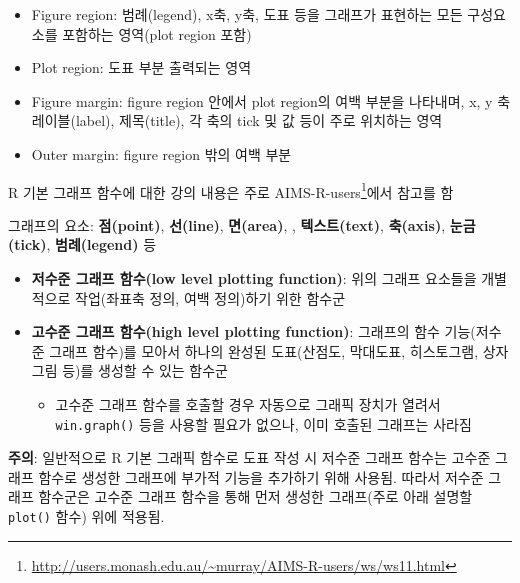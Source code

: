 \documentclass[
  11pt,
]{krantz}
\makeatletter
\providecommand{\tightlist}{%
  \setlength{\itemsep}{0pt}\setlength{\parskip}{0pt}}
\renewcommand{\href}[2]{#2\footnote{\url{#1}}}
\newenvironment{kframe}{%
\medskip{}
\setlength{\fboxsep}{.8em}
 \def\at@end@of@kframe{}%
 \ifinner\ifhmode%
  \def\at@end@of@kframe{\end{minipage}}%
  \begin{minipage}{\columnwidth}%
 \fi\fi%
 \def\FrameCommand##1{\hskip\@totalleftmargin \hskip-\fboxsep
 \colorbox{shadecolor}{##1}\hskip-\fboxsep
     \hskip-\linewidth \hskip-\@totalleftmargin \hskip\columnwidth}%
 \MakeFramed {\advance\hsize-\width
   \@totalleftmargin\z@ \linewidth\hsize
   \@setminipage}}%
 {\par\unskip\endMakeFramed%
 \at@end@of@kframe}
\newenvironment{rmdblock}[1]
  {
  \begin{itemize}
  \renewcommand{\labelitemi}{
    \raisebox{-.7\height}[0pt][0pt]{
      {\setkeys{Gin}{width=3em,keepaspectratio}\texttt{[image: images/\#1]}}
    }
  }
  \setlength{\fboxsep}{1em}
  \begin{kframe}
  \item
  }
  {
  \end{kframe}
  \end{itemize}
  }
\newenvironment{rmdnote}
  {\begin{rmdblock}{note}}
  {\end{rmdblock}}
\newenvironment{rmdcaution}
  {\begin{rmdblock}{caution}}
  {\end{rmdblock}}
\makeatother
\begin{document}
\begin{itemize}
\tightlist
\item
  Figure region: 범례(legend), x축, y축, 도표 등을 그래프가 표현하는 모든 구성요소를 포함하는 영역(plot region 포함)
\item
  Plot region: 도표 부분 출력되는 영역
\item
  Figure margin: figure region 안에서 plot region의 여백 부분을 나타내며, x, y 축 레이블(label), 제목(title), 각 축의 tick 및 값 등이 주로 위치하는 영역
\item
  Outer margin: figure region 밖의 여백 부분
\end{itemize}

\footnotesize

\begin{rmdnote}
\begin{rmdnote}

R 기본 그래프 함수에 대한 강의 내용은 주로 \href{http://users.monash.edu.au/~murray/AIMS-R-users/ws/ws11.html}{AIMS-R-users}에서 참고를 함

\end{rmdnote}
\end{rmdnote}

\normalsize

그래프의 요소: \textbf{점(point)}, \textbf{선(line)}, \textbf{면(area)}, , \textbf{텍스트(text)}, \textbf{축(axis)}, \textbf{눈금(tick)}, \textbf{범례(legend)} 등

\begin{itemize}
\tightlist
\item
  \textbf{저수준 그래프 함수(low level plotting function)}: 위의 그래프 요소들을 개별적으로 작업(좌표축 정의, 여백 정의)하기 위한 함수군
\item
  \textbf{고수준 그래프 함수(high level plotting function)}: 그래프의 함수 기능(저수준 그래프 함수)를 모아서 하나의 완성된 도표(산점도, 막대도표, 히스토그램, 상자그림 등)를 생성할 수 있는 함수군

  \begin{itemize}
  \tightlist
  \item
    고수준 그래프 함수를 호출할 경우 자동으로 그래픽 장치가 열려서 \texttt{win.graph()} 등을 사용할 필요가 없으나, 이미 호출된 그래프는 사라짐
  \end{itemize}
\end{itemize}

\footnotesize

\begin{rmdcaution}
\begin{rmdcaution}

\textbf{주의}: 일반적으로 R 기본 그래픽 함수로 도표 작성 시 저수준 그래프 함수는 고수준 그래프 함수로 생성한 그래프에 부가적 기능을 추가하기 위해 사용됨. 따라서 저수준 그래프 함수군은 고수준 그래프 함수을 통해 먼저 생성한 그래프(주로 아래 설명할 \texttt{plot()} 함수) 위에 적용됨.

\end{rmdcaution}
\end{rmdcaution}
\end{document}
